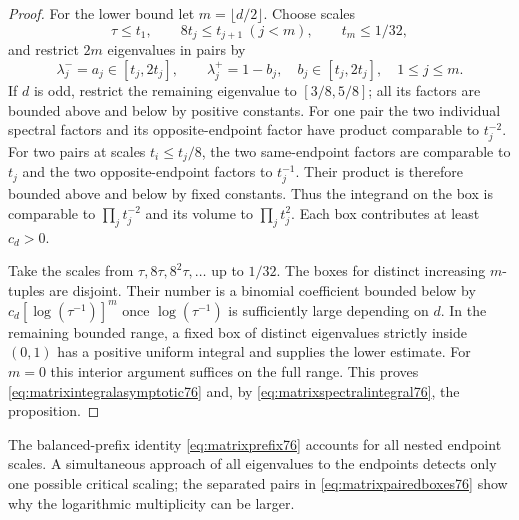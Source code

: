 \begin{proof}
For the lower bound let $m=\lfloor d/2\rfloor$. Choose scales
\begin{equation}\label{eq:matrixnestedscales76}
 \tau\le t_1,\qquad 8t_j\le t_{j+1}\ (j<m),
                 \qquad t_m\le1/32,
\end{equation}
and restrict $2m$ eigenvalues in pairs by
\begin{equation}\label{eq:matrixpairedboxes76}
 \lambda_j^-=a_j\in[t_j,2t_j],\qquad
 \lambda_j^+=1-b_j,\quad b_j\in[t_j,2t_j],
                         \quad1\le j\le m.
\end{equation}
If $d$ is odd, restrict the remaining eigenvalue to $[3/8,5/8]$;
all its factors are bounded above and below by positive constants.
For one pair the two individual spectral factors and its
opposite-endpoint factor have product comparable to $t_j^{-2}$.
For two pairs at scales $t_i\le t_j/8$, the two same-endpoint
factors are comparable to $t_j$ and the two opposite-endpoint
factors to $t_j^{-1}$. Their product is therefore bounded above
and below by fixed constants. Thus the integrand on the box is
comparable to $\prod_jt_j^{-2}$ and its volume to
$\prod_jt_j^2$. Each box contributes at least $c_d>0$.

Take the scales from $\tau,8\tau,8^2\tau,\ldots$ up to $1/32$.
The boxes for distinct increasing $m$-tuples are disjoint.
Their number is a binomial coefficient bounded below by
$c_d[\log(\tau^{-1})]^m$ once $\log(\tau^{-1})$ is sufficiently
large depending on $d$. In the remaining bounded range, a fixed
box of distinct eigenvalues strictly inside $(0,1)$ has a
positive uniform integral and supplies the lower estimate.
For $m=0$ this interior argument suffices on the full range.
This proves \eqref{eq:matrixintegralasymptotic76} and, by
\eqref{eq:matrixspectralintegral76}, the proposition.
\end{proof}

The balanced-prefix identity \eqref{eq:matrixprefix76} accounts for
all nested endpoint scales. A simultaneous approach of all eigenvalues
to the endpoints detects only one possible critical scaling; the
separated pairs in \eqref{eq:matrixpairedboxes76} show why the
logarithmic multiplicity can be larger.

